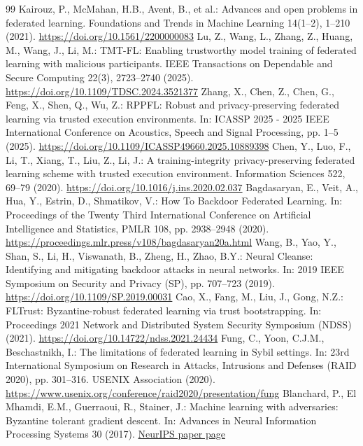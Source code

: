 \documentclass[11pt, a4paper, UTF8, fontset=fandol]{ctexart}
\begin{document}
\begin{thebibliography}{99}
     Kairouz, P., McMahan, H.B., Avent, B., et al.: Advances and open problems in federated learning. Foundations and Trends in Machine Learning 14(1--2), 1--210 (2021). \url{https://doi.org/10.1561/2200000083}
     Lu, Z., Wang, L., Zhang, Z., Huang, M., Wang, J., Li, M.: TMT-FL: Enabling trustworthy model training of federated learning with malicious participants. IEEE Transactions on Dependable and Secure Computing 22(3), 2723--2740 (2025). \url{https://doi.org/10.1109/TDSC.2024.3521377}
     Zhang, X., Chen, Z., Chen, G., Feng, X., Shen, Q., Wu, Z.: RPPFL: Robust and privacy-preserving federated learning via trusted execution environments. In: ICASSP 2025 - 2025 IEEE International Conference on Acoustics, Speech and Signal Processing, pp. 1--5 (2025). \url{https://doi.org/10.1109/ICASSP49660.2025.10889398}
     Chen, Y., Luo, F., Li, T., Xiang, T., Liu, Z., Li, J.: A training-integrity privacy-preserving federated learning scheme with trusted execution environment. Information Sciences 522, 69--79 (2020). \url{https://doi.org/10.1016/j.ins.2020.02.037}
     Bagdasaryan, E., Veit, A., Hua, Y., Estrin, D., Shmatikov, V.: How To Backdoor Federated Learning. In: Proceedings of the Twenty Third International Conference on Artificial Intelligence and Statistics, PMLR 108, pp. 2938--2948 (2020). \url{https://proceedings.mlr.press/v108/bagdasaryan20a.html}
     Wang, B., Yao, Y., Shan, S., Li, H., Viswanath, B., Zheng, H., Zhao, B.Y.: Neural Cleanse: Identifying and mitigating backdoor attacks in neural networks. In: 2019 IEEE Symposium on Security and Privacy (SP), pp. 707--723 (2019). \url{https://doi.org/10.1109/SP.2019.00031}
     Cao, X., Fang, M., Liu, J., Gong, N.Z.: FLTrust: Byzantine-robust federated learning via trust bootstrapping. In: Proceedings 2021 Network and Distributed System Security Symposium (NDSS) (2021). \url{https://doi.org/10.14722/ndss.2021.24434}
     Fung, C., Yoon, C.J.M., Beschastnikh, I.: The limitations of federated learning in Sybil settings. In: 23rd International Symposium on Research in Attacks, Intrusions and Defenses (RAID 2020), pp. 301--316. USENIX Association (2020). \url{https://www.usenix.org/conference/raid2020/presentation/fung}
     Blanchard, P., El Mhamdi, E.M., Guerraoui, R., Stainer, J.: Machine learning with adversaries: Byzantine tolerant gradient descent. In: Advances in Neural Information Processing Systems 30 (2017). \href{https://papers.nips.cc/paper/6617-machine-learning-with-adversaries-byzantine-tolerant-gradient-descent}{NeurIPS paper page}

\end{thebibliography}
\end{document}
